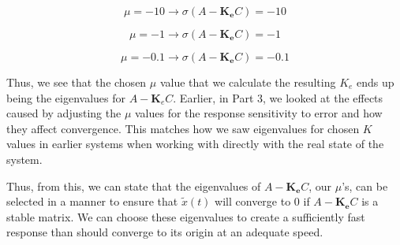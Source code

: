 \documentclass{article}
\begin{document}
\begin{equation}
    \mu = -10 \to \sigma(A-\boldsymbol{K_e}C) = -10
\end{equation}

\begin{equation}
    \mu = -1 \to \sigma(A-\boldsymbol{K_e}C) = -1
\end{equation}

\begin{equation}
    \mu = -0.1 \to \sigma(A-\boldsymbol{K_e}C) = -0.1
\end{equation}

Thus, we see that the chosen $\mu$ value that we calculate the resulting $K_e$ ends up being the eigenvalues for $A-\boldsymbol{K}_e C$. Earlier, in Part 3, we looked at the effects caused by adjusting the $\mu$ values for the response sensitivity to error and how they affect convergence. This matches how we saw eigenvalues for chosen $K$ values in earlier systems when working with directly with the real state of the system.

Thus, from this, we can state that the eigenvalues of $A-\boldsymbol{K_e}C$, our $\mu$'s, can be selected in a manner to ensure that $\tilde{x}(t)$ will converge to 0 if $A-\boldsymbol{K_e}C$ is a stable matrix. We can choose these eigenvalues to create a sufficiently fast response than should converge to its origin at an adequate speed.
\end{document}
